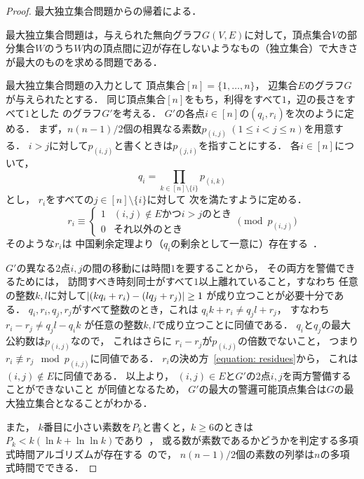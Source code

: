 \begin{proof}
  最大独立集合問題からの帰着による．

  最大独立集合問題は，与えられた無向グラフ$G(V, E)$に対して，頂点集合$V$の部分集合$W$のうち$W$内の頂点間に辺が存在しないようなもの（独立集合）で大きさが最大のものを求める問題である．

  \newcommand{\primenum}[2]{p_{(#1,#2)}}
  最大独立集合問題の入力として
  頂点集合$[n] = \{1, \ldots, n\}$，
  辺集合$E$のグラフ$G$が与えられたとする．
  同じ頂点集合$[n]$をもち，利得をすべて$1$，辺の長さをすべて$1$とした
  {\graphUnit}のグラフ$G'$を考える．
  $G'$の各点$i \in [n]$の{\exactIdletime}$(q_i, r_i)$を次のように定める．
  まず，$n(n - 1)/2$個の相異なる素数$\primenum{i}{j}\ (1 \leq i < j \leq n)$を用意する．
  $i > j$に対して$\primenum{i}{j}$と書くときは$\primenum{j}{i}$を指すことにする．
  各$i \in [n]$について，
  \begin{equation}
    q_i = \prod_{k \in [n] \setminus \{i\}} \primenum{i}{k}
  \end{equation}
  とし，
  $r _i$をすべての$j \in [n] \setminus \{i\}$に対して
  次を満たすように定める．
  \begin{equation}
    \label{equation: residues}
    r _i
    \equiv
    \begin{cases}
      1 & \text{$(i, j) \notin E$かつ$i > j$のとき} \\
      0 & \text{それ以外のとき}
    \end{cases}
    \pmod{p _{(i, j)}}
  \end{equation}
  そのような$r _i$は
  中国剰余定理より（$q _i$の剰余として一意に）存在する~\cite{}．

  $G'$の異なる2点$i, j$の間の移動には時間$1$を要することから，
  その両方を警備できるためには，
  訪問すべき時刻同士がすべて$1$以上離れていること，すなわち
  任意の整数$k, l$に対して$\lvert{(k q_i + r_i) - (l q_j + r_j)}\rvert \geq 1$%
  が成り立つことが必要十分である．
  $q_i, r_i, q_j, r_j$がすべて整数のとき，これは
  $q_i k + r_i \neq q_j l + r_j$，
  すなわち
  $r_i - r_j \neq q_j l - q_i k$%
  が任意の整数$k, l$で成り立つことに同値である．
  $q _i$と$q _j$の最大公約数は$p _{(i, j)}$なので，
  これはさらに
  $r_i - r_j$が$p _{(i, j)}$の倍数でないこと，
  つまり$r_i \not\equiv r_j \mod p _{(i, j)}$に同値である．
  $r_i$の決め方~\eqref{equation: residues}から，
  これは$(i, j) \notin E$に同値である．
  以上より，
  $(i, j) \in E$と$G'$の2点$i, j$を両方警備することができないこと
  が同値となるため，
  $G'$の最大の警邏可能頂点集合は$G$の最大独立集合となることがわかる．

  また，
  $k$番目に小さい素数を$P_k$と書くと，$k \geq 6$のときは
  $P_k < k( \ln k + \ln\ln k )$であり~\cite{dusart1999k}，
  或る数が素数であるかどうかを判定する多項式時間アルゴリズムが存在する~\cite{agrawal2004primes}ので，
  $n(n - 1)/2$個の素数の列挙は$n$の多項式時間でできる．
\end{proof}
